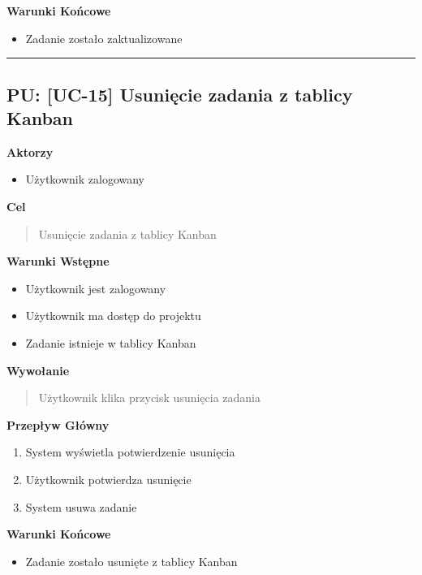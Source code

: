 \vspace{0.2cm}
\noindent\textbf{Warunki Końcowe}
\begin{itemize}
    \item Zadanie zostało zaktualizowane
\end{itemize}


\hrule
\vspace{1cm}

\subsection*{PU: [UC-15] Usunięcie zadania z tablicy Kanban}

\noindent\textbf{Aktorzy}
\begin{itemize}
    \item Użytkownik zalogowany
\end{itemize}

\vspace{0.2cm}
\noindent\textbf{Cel}
\begin{quote}
    Usunięcie zadania z tablicy Kanban
\end{quote}

\vspace{0.2cm}
\noindent\textbf{Warunki Wstępne}
\begin{itemize}
    \item Użytkownik jest zalogowany
    \item Użytkownik ma dostęp do projektu
    \item Zadanie istnieje w tablicy Kanban
\end{itemize}

\vspace{0.2cm}
\noindent\textbf{Wywołanie}
\begin{quote}
    Użytkownik klika przycisk usunięcia zadania
\end{quote}

\vspace{0.2cm}
\noindent\textbf{Przepływ Główny}
\begin{enumerate}
    \item System wyświetla potwierdzenie usunięcia
    \item Użytkownik potwierdza usunięcie
    \item System usuwa zadanie
\end{enumerate}

\vspace{0.2cm}
\noindent\textbf{Warunki Końcowe}
\begin{itemize}
    \item Zadanie zostało usunięte z tablicy Kanban
\end{itemize}

